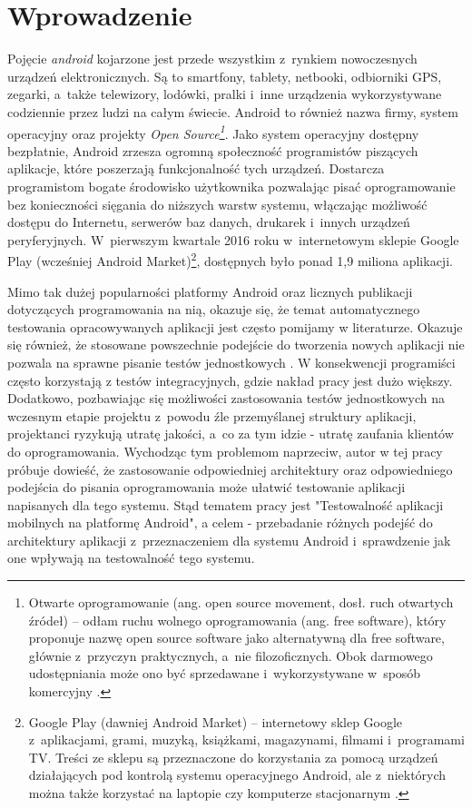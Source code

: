 \chapter{Wprowadzenie}
\label{wstep}

Pojęcie \textit{android} kojarzone jest przede wszystkim z~rynkiem nowoczesnych urządzeń elektronicznych. Są to smartfony, tablety, netbooki, odbiorniki GPS, zegarki, a~także telewizory, lodówki, pralki i~inne urządzenia wykorzystywane codziennie przez ludzi na całym świecie. Android to również nazwa firmy, system operacyjny oraz projekty \textit{Open Source\footnote{Otwarte oprogramowanie (ang. open source movement, dosł. ruch otwartych źródeł) – odłam ruchu wolnego oprogramowania (ang. free software), który proponuje nazwę open source software jako alternatywną dla free software, głównie z~przyczyn praktycznych, a~nie filozoficznych. Obok darmowego udostępniania może ono być sprzedawane i~wykorzystywane w~sposób komercyjny \cite{website:wikipedia}.}}. Jako system operacyjny dostępny bezpłatnie, Android zrzesza ogromną społeczność programistów piszących aplikacje, które poszerzają funkcjonalność tych urządzeń. Dostarcza programistom bogate środowisko użytkownika pozwalając pisać oprogramowanie bez konieczności sięgania do niższych warstw systemu, włączając możliwość dostępu do Internetu, serwerów baz danych, drukarek i~innych urządzeń peryferyjnych. W~pierwszym kwartale 2016 roku w~internetowym sklepie Google Play (wcześniej Android Market)\footnote{Google Play (dawniej Android Market) – internetowy sklep Google z~aplikacjami, grami, muzyką, książkami, magazynami, filmami i~programami TV. Treści ze sklepu są przeznaczone do korzystania za pomocą urządzeń działających pod kontrolą systemu operacyjnego Android, ale z~niektórych można także korzystać na laptopie czy komputerze stacjonarnym \cite{website:wikipedia}.}, dostępnych było ponad 1,9 miliona aplikacji. 

Mimo tak dużej popularności platformy Android oraz licznych publikacji dotyczących programowania na nią, okazuje się, że temat automatycznego testowania opracowywanych aplikacji jest często pomijamy w literaturze. Okazuje się również, że stosowane powszechnie podejście do tworzenia nowych aplikacji nie pozwala na sprawne pisanie testów jednostkowych \cite{tematpracy}. W konsekwencji programiści często korzystają z testów integracyjnych, gdzie nakład pracy jest dużo większy. Dodatkowo, pozbawiając się możliwości zastosowania testów jednostkowych na wczesnym etapie projektu z~powodu źle przemyślanej struktury aplikacji, projektanci ryzykują utratę jakości, a~co za tym idzie - utratę zaufania klientów do oprogramowania. Wychodząc tym problemom naprzeciw, autor w tej pracy próbuje dowieść, że zastosowanie odpowiedniej architektury oraz odpowiedniego podejścia do pisania oprogramowania może ułatwić testowanie aplikacji napisanych dla tego systemu. Stąd tematem pracy jest "Testowalność aplikacji mobilnych na platformę Android", a celem - przebadanie różnych podejść do architektury aplikacji z~przeznaczeniem dla systemu Android i~sprawdzenie jak one wpływają na testowalność tego systemu. 

